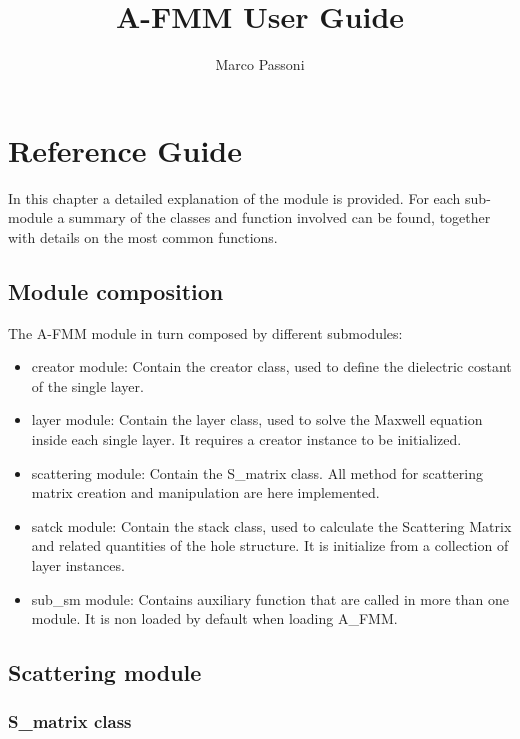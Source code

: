 \documentclass[a4paper,10pt]{report}
\title{A-FMM User Guide}
\author{Marco Passoni}
\date{}
\begin{document}
\maketitle

\chapter{Reference Guide}
In this chapter a detailed explanation of the module is provided. For each sub-module a summary of the classes and function involved can be found, together with details on the most common functions.
\section{Module composition}
The A-FMM module in turn composed by different submodules:
\begin{itemize}
\item creator module: Contain the creator class, used to define the dielectric costant of the single layer.   
\item layer module: Contain the layer class, used to solve the Maxwell equation inside each single layer. It requires a creator instance to be initialized.
\item scattering module: Contain the S\_matrix class. All method for scattering matrix creation and manipulation are here implemented.  
\item satck module: Contain the stack class, used to calculate the Scattering Matrix and related quantities of the hole structure. It is initialize from a collection of layer instances.
\item sub\_sm module: Contains auxiliary function that are called in more than one module. It is non loaded by default when loading A\_FMM.
\end{itemize}

\section{Scattering module}
\subsection{S\_matrix class}
\end{document}
